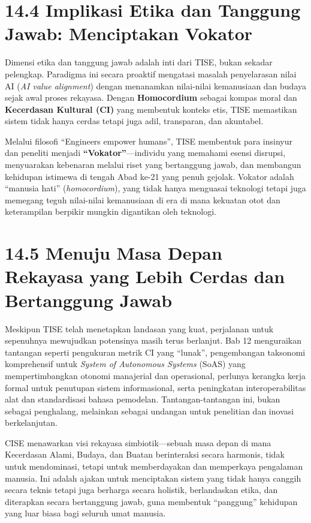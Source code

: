 \documentclass[
  letterpaper,
  DIV=11,
  numbers=noendperiod]{scrreprt}
\begin{document}
\section{\texorpdfstring{\textbf{14.4 Implikasi Etika dan Tanggung
Jawab: Menciptakan
Vokator}}{14.4 Implikasi Etika dan Tanggung Jawab: Menciptakan Vokator}}\label{implikasi-etika-dan-tanggung-jawab-menciptakan-vokator}

Dimensi etika dan tanggung jawab adalah inti dari TISE, bukan sekadar
pelengkap. Paradigma ini secara proaktif mengatasi masalah penyelarasan
nilai AI (\emph{AI value alignment}) dengan menanamkan nilai-nilai
kemanusiaan dan budaya sejak awal proses rekayasa. Dengan
\textbf{Homocordium} sebagai kompas moral dan \textbf{Kecerdasan
Kultural (CI)} yang membentuk konteks etis, TISE memastikan sistem tidak
hanya cerdas tetapi juga adil, transparan, dan akuntabel.

Melalui filosofi ``Engineers empower humans'', TISE membentuk para
insinyur dan peneliti menjadi \textbf{``Vokator''}---individu yang
memahami esensi disrupsi, menyuarakan kebenaran melalui riset yang
bertanggung jawab, dan membangun kehidupan istimewa di tengah Abad ke-21
yang penuh gejolak. Vokator adalah ``manusia hati''
(\emph{homocordium}), yang tidak hanya menguasai teknologi tetapi juga
memegang teguh nilai-nilai kemanusiaan di era di mana kekuatan otot dan
keterampilan berpikir mungkin digantikan oleh teknologi.

\section{\texorpdfstring{\textbf{14.5 Menuju Masa Depan Rekayasa yang
Lebih Cerdas dan Bertanggung
Jawab}}{14.5 Menuju Masa Depan Rekayasa yang Lebih Cerdas dan Bertanggung Jawab}}\label{menuju-masa-depan-rekayasa-yang-lebih-cerdas-dan-bertanggung-jawab}

Meskipun TISE telah menetapkan landasan yang kuat, perjalanan untuk
sepenuhnya mewujudkan potensinya masih terus berlanjut. Bab 12
menguraikan tantangan seperti pengukuran metrik CI yang ``lunak'',
pengembangan taksonomi komprehensif untuk \emph{System of Autonomous
Systems} (SoAS) yang mempertimbangkan otonomi manajerial dan
operasional, perlunya kerangka kerja formal untuk penutupan sistem
informasional, serta peningkatan interoperabilitas alat dan
standardisasi bahasa pemodelan. Tantangan-tantangan ini, bukan sebagai
penghalang, melainkan sebagai undangan untuk penelitian dan inovasi
berkelanjutan.

CISE menawarkan visi rekayasa simbiotik---sebuah masa depan di mana
Kecerdasan Alami, Budaya, dan Buatan berinteraksi secara harmonis, tidak
untuk mendominasi, tetapi untuk memberdayakan dan memperkaya pengalaman
manusia. Ini adalah ajakan untuk menciptakan sistem yang tidak hanya
canggih secara teknis tetapi juga berharga secara holistik, berlandaskan
etika, dan diterapkan secara bertanggung jawab, guna membentuk
``panggung'' kehidupan yang luar biasa bagi seluruh umat manusia.
\end{document}
